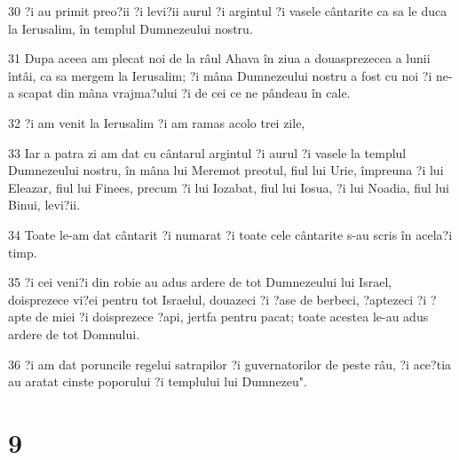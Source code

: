 \par 30 ?i au primit preo?ii ?i levi?ii aurul ?i argintul ?i vasele cântarite ca sa le duca la Ierusalim, în templul Dumnezeului nostru.
\par 31 Dupa aceea am plecat noi de la râul Ahava în ziua a douasprezecea a lunii întâi, ca sa mergem la Ierusalim; ?i mâna Dumnezeului nostru a fost cu noi ?i ne-a scapat din mâna vrajma?ului ?i de cei ce ne pândeau în cale.
\par 32 ?i am venit la Ierusalim ?i am ramas acolo trei zile,
\par 33 Iar a patra zi am dat cu cântarul argintul ?i aurul ?i vasele la templul Dumnezeului nostru, în mâna lui Meremot preotul, fiul lui Urie, împreuna ?i lui Eleazar, fiul lui Finees, precum ?i lui Iozabat, fiul lui Iosua, ?i lui Noadia, fiul lui Binui, levi?ii.
\par 34 Toate le-am dat cântarit ?i numarat ?i toate cele cântarite s-au scris în acela?i timp.
\par 35 ?i cei veni?i din robie au adus ardere de tot Dumnezeului lui Israel, doisprezece vi?ei pentru tot Israelul, douazeci ?i ?ase de berbeci, ?aptezeci ?i ?apte de miei ?i doisprezece ?api, jertfa pentru pacat; toate acestea le-au adus ardere de tot Domnului.
\par 36 ?i am dat poruncile regelui satrapilor ?i guvernatorilor de peste râu, ?i ace?tia au aratat cinste poporului ?i templului lui Dumnezeu".

\chapter{9}

